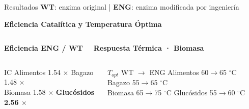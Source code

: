 \begin{frame}{Resultados \hfill{\tiny\color{TextoSuave}\textbf{WT}: enzima original \quad | \quad \textbf{ENG}: enzima modificada por ingeniería}}



{\color{Cian}\bfseries Eficiencia Catalítica y Temperatura Óptima}\par
\vspace{0.06cm}

\begin{columns}[T,onlytextwidth]
{\scriptsize\bfseries\color{Texto}Eficiencia ENG / WT}\par\vspace{0.04cm}

{\scriptsize\bfseries\color{Texto}Respuesta Térmica · Biomasa}\par\vspace{0.04cm}
\end{columns}

\vspace{0.08cm}
\begin{columns}[T,onlytextwidth]
\begin{block}{IC}
\centering\scriptsize
Alimentos 1.54 $\times$ \quad Bagazo 1.48 $\times$\\
Biomasa 1.58 $\times$ \quad \textbf{Glucósidos 2.56 $\times$}
\end{block}
\begin{alertblock}{$T_{opt}$ WT $\rightarrow$ ENG}
\centering\scriptsize
Alimentos 60$\rightarrow$65 $^{\circ}$C \quad Bagazo 55$\rightarrow$65 $^{\circ}$C\\
Biomasa 65$\rightarrow$75 $^{\circ}$C \quad Glucósidos 55$\rightarrow$60 $^{\circ}$C
\end{alertblock}
\end{columns}
\end{frame}
